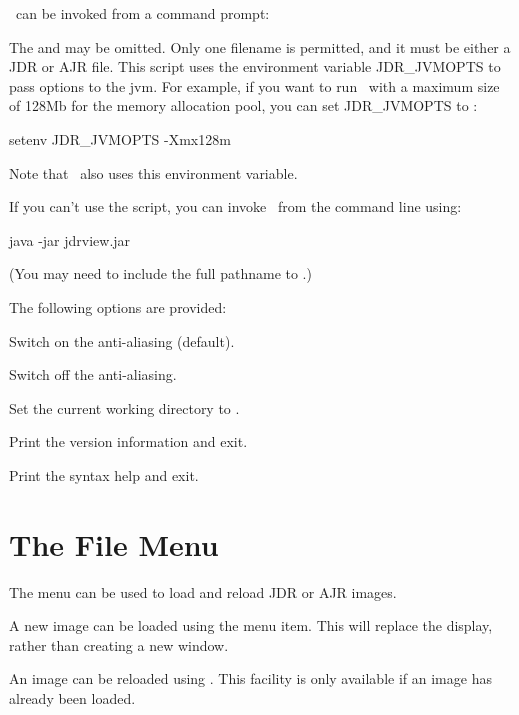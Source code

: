 \JDRView\ can be invoked from a command prompt:

The  and  may be omitted.
Only one filename is permitted, and it must be either a
\gls{JDR} or \gls{AJR} file. This script uses the environment
variable \gls{JDR_JVMOPTS} to pass options to the \gls{jvm}.
For example, if you want to run \JDRView\ with a maximum size
of 128Mb for the memory allocation pool, you can set
\gls{JDR_JVMOPTS} to :
\begin{terminal}
setenv JDR\_JVMOPTS -Xmx128m
\end{terminal}
Note that \FlowframTk\ also uses this environment variable.

If you can't use the  script, you can invoke
\JDRView\ from the command line using:
\begin{terminal}
java -jar jdrview.jar  
\end{terminal}
(You may need to include the full pathname to .)

The following options are provided:

Switch on the anti-aliasing (default).

Switch off the anti-aliasing.

Set the current working directory to .

Print the version information and exit.

Print the syntax help and exit.

\chapter{The File Menu}\label{sec:thefilemenu}


The  menu can be used to load and reload \gls{JDR}
or \gls{AJR} images.


A new image can be loaded using the  menu item.
This will replace the display, rather than creating a new window.


An image can be reloaded using . This
facility is only available if an image has already been loaded.


